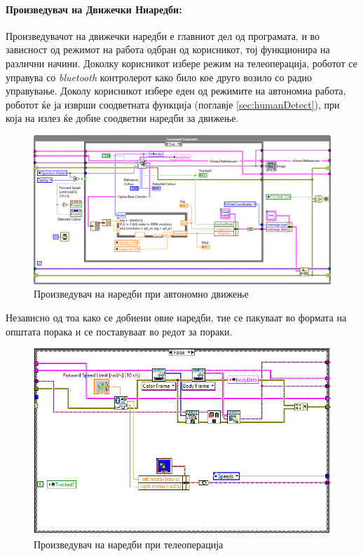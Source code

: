 \documentclass[11pt]{article}
\begin{document}
    \paragraph{Произведувач на Движечки Ннаредби:\\}
      Произведувачот на движечки наредби е главниот дел од програмата, и во зависност од режимот на работа одбран од корисникот, тој функционира на различни начини. Доколку корисникот избере режим на телеоперација, роботот се управува со \textit{bluetooth} контролерот како било кое друго возило со радио управување. Доколу корисникот избере еден од режимите на автономна работа, роботот ќе ја изврши соодветната функција (поглавје \ref{sec:humanDetect}), при која на излез ќе добие соодветни наредби за движење.
      \begin{figure}[H]
        \centering
        \includegraphics[angle=-90, scale=0.75]{./images/command_generator_true.png} %
        \caption{Произведувач на наредби при автономно движење}
        \end{figure}
      Независно од тоа како се добиени овие наредби, тие се пакуваат во формата на општата порака и се поставуваат во редот за пораки.
      \begin{figure}[H]
        \centering
        \includegraphics[width=0.8\linewidth]{./images/command_generator_false.png}
        \caption{Произведувач на наредби при телеоперација}
        \end{figure}
\end{document}
